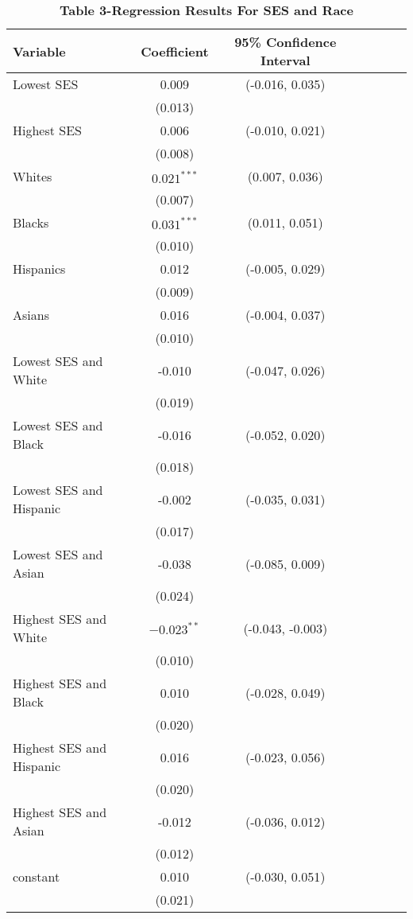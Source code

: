 \documentclass{article}
\begin{document}
\begin{table}[H]
\centering 
\setlength\extrarowheight{-9pt}
	
\begin{threeparttable}

	\singlespace
	  \caption*{\textbf{Table 3-Regression Results For SES and Race}}
	  
		\begin{tabular}{l*{6}{c}}
\hline \hline
Variable & Coefficient & 95\% Confidence Interval \\
\hline
Lowest SES & 0.009 & (-0.016, 0.035) \\
& (0.013) & \\
Highest SES & 0.006 & (-0.010, 0.021) \\
& (0.008) & \\
Whites & $0.021^{***}$ & (0.007, 0.036) \\
& (0.007) & \\
Blacks & $0.031^{***}$ & (0.011, 0.051) \\
& (0.010) & \\
Hispanics & 0.012 & (-0.005, 0.029) \\
& (0.009) & \\
Asians & 0.016 & (-0.004, 0.037) \\
& (0.010) & \\
Lowest SES and White & -0.010 & (-0.047, 0.026) \\
& (0.019) & \\
Lowest SES and Black & -0.016 & (-0.052, 0.020) \\
& (0.018) & \\
Lowest SES and Hispanic & -0.002 & (-0.035, 0.031) \\
& (0.017) & \\
Lowest SES and Asian & -0.038 & (-0.085, 0.009) \\
& (0.024) & \\
Highest SES and White & $-0.023^{**}$ & (-0.043, -0.003) \\
& (0.010) & \\
Highest SES and Black & 0.010 &  (-0.028, 0.049) \\
& (0.020) & \\
Highest SES and Hispanic & 0.016 & (-0.023, 0.056) \\
& (0.020) & \\
Highest SES and Asian & -0.012 & (-0.036, 0.012) \\
& (0.012) & \\
constant & 0.010 & (-0.030, 0.051) \\
& (0.021) & \\
\hline
	\end{tabular}


\end{threeparttable}
\end{table}
\end{document}
